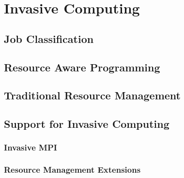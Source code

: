 \chapter{Invasive Computing}\label{chapter:invasive computing}
\section{Job Classification}
\section{Resource Aware Programming}
\section{Traditional Resource Management}
\section{Support for Invasive Computing}
\subsection{Invasive MPI}
\subsection{Resource Management Extensions}
